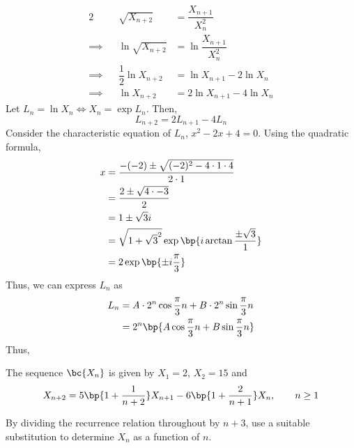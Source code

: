 \documentclass{echw}
\begin{document}
    \solution
        \begin{alignat*}{2}
            &&\sqrt{X_{n+2}} &= \dfrac{X_{n+1}}{X_n^2}\\
            \implies&&\ln \sqrt{X_{n+2}} &= \ln \dfrac{X_{n+1}}{X_n^2}\\
            \implies&&\dfrac12 \ln X_{n+2} &= \ln X_{n+1} - 2 \ln X_n\\
            \implies&&\ln X_{n+2} &= 2\ln X_{n+1} - 4\ln X_n
        \end{alignat*}
        Let $L_n = \ln X_n \iff X_n = \exp{L_n}$. Then,
        \[
            L_{n+2} = 2L_{n+1} - 4L_n
        \]
        Consider the characteristic equation of $L_n$, $x^2 - 2x + 4 = 0$. Using the quadratic formula,
        \begin{align*}
            x &= \dfrac{-(-2) \pm \sqrt{(-2)^2 - 4\cdot1\cdot4}}{2\cdot1}\\
            &= \dfrac{2 \pm \sqrt{4 \cdot -3}}{2}\\
            &= 1 \pm \sqrt{3}i\\
            &= \sqrt{1 + \sqrt{3}^2} \exp{\bp{i \arctan{\dfrac{\pm{\sqrt3}}1}}}\\
            &= 2 \exp \bp{\pm i \dfrac{\pi}3}
        \end{align*}
        Thus, we can express $L_n$ as
        \begin{align*}
            L_n &= A \cdot 2^n \cos{\dfrac{\pi}3 n} + B \cdot 2^n \sin{\dfrac{\pi}3 n}\\
            &= 2^n \bp{A \cos{\dfrac{\pi}3 n} + B \sin{\dfrac{\pi}3 n}}
        \end{align*}
        Thus,

    \problem{}
        The sequence $\bc{X_n}$ is given by $X_1 = 2$, $X_2 = 15$ and
        \[
            X_{n+2} = 5\bp{1 + \dfrac1{n+2}}X_{n+1} - 6\bp{1 + \dfrac2{n+1}}X_n, \qquad n \geq 1
        \]

        By dividing the recurrence relation throughout by $n+3$, use a suitable substitution to determine $X_n$ as a function of $n$.
\end{document}

